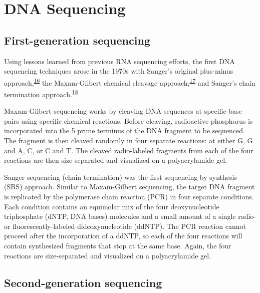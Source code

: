 \documentclass[11pt,letterpaper]{book}
\begin{document}
\hypertarget{dna-sequencing}{%
\section{DNA Sequencing}\label{dna-sequencing}}

\hypertarget{first-generation-sequencing}{%
\subsection{First-generation sequencing}\label{first-generation-sequencing}}

Using lessons learned from previous RNA sequencing efforts, the first DNA sequencing techniques arose in the 1970s with Sanger's original plus-minus approach,\textsuperscript{\protect\hyperlink{ref-sanger:1975aa}{16}} the Maxam-Gilbert chemical cleavage approach,\textsuperscript{\protect\hyperlink{ref-maxam:1977aa}{17}} and Sanger's chain termination approach.\textsuperscript{\protect\hyperlink{ref-sanger:1977aa}{18}}

Maxam-Gilbert sequencing works by cleaving DNA sequences at specific base pairs using specific chemical reactions.
Before cleaving, radioactive phosphorus is incorporated into the 5 prime terminus of the DNA fragment to be sequenced.
The fragment is then cleaved randomly in four separate reactions: at either G, G and A, C, or C and T.
The cleaved radio-labeled fragments from each of the four reactions are then size-separated and visualized on a polyacrylamide gel.

Sanger sequencing (chain termination) was the first sequencing by synthesis (SBS) approach.
Similar to Maxam-Gilbert sequencing, the target DNA fragment is replicated by the polymerase chain reaction (PCR) in four separate conditions.
Each condition contains an equimolar mix of the four deoxynucleotide triphosphate (dNTP, DNA bases) molecules and a small amount of a single radio- or fluorescently-labeled dideoxynucleotide (ddNTP).
The PCR reaction cannot proceed after the incorporation of a ddNTP, so each of the four reactions will contain synthesized fragments that stop at the same base.
Again, the four reactions are size-separated and visualized on a polyacrylamide gel.

\hypertarget{second-generation-sequencing}{%
\subsection{Second-generation sequencing}\label{second-generation-sequencing}}
\end{document}
